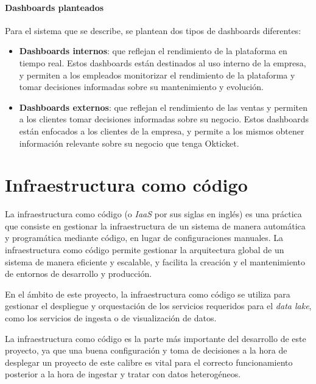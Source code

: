 \newpage{}
\paragraph{Dashboards planteados}
Para el sistema que se describe, se plantean dos tipos de dashboards diferentes:

\begin{itemize}
	\item \textbf{Dashboards internos}: que reflejan el rendimiento de la
		plataforma en tiempo real. Estos dashboards están destinados al uso
		interno de la empresa, y permiten a los empleados monitorizar el
		rendimiento de la plataforma y tomar decisiones informadas sobre su
		mantenimiento y evolución.
	\item \textbf{Dashboards externos}: que reflejan el rendimiento de las
		ventas y permiten a los clientes tomar decisiones informadas sobre su
		negocio. Estos dashboards están enfocados a los clientes de la empresa,
		y permite a los mismos obtener información relevante sobre su negocio
		que tenga Okticket.
\end{itemize}


\section{Infraestructura como código}
La infraestructura como código (o \textit{IaaS} por sus siglas en inglés) es una
práctica que consiste en gestionar la infraestructura de un sistema de manera
automática y programática mediante código, en lugar de configuraciones manuales.
La infraestructura como código permite gestionar la arquitectura global de un
sistema de manera eficiente y escalable, y facilita la creación y el mantenimiento
de entornos de desarrollo y producción.

En el ámbito de este proyecto, la infraestructura como código se utiliza para
gestionar el despliegue y orquestación de los servicios requeridos para el
\textit{data lake}, como los servicios de ingesta o de visualización de datos.

La infraestructura como código es la parte más importante del desarrollo de este
proyecto, ya que una buena configuración y toma de decisiones a la hora de
desplegar un proyecto de este calibre es vital para el correcto funcionamiento
posterior a la hora de ingestar y tratar con datos heterogéneos.
